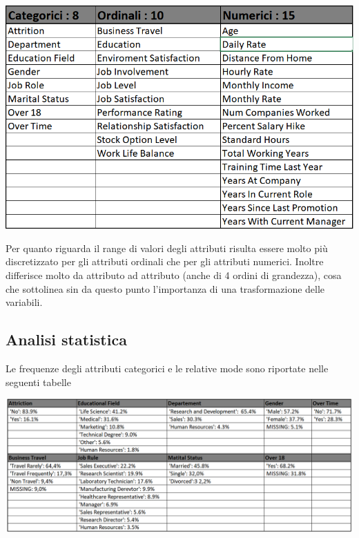 \documentclass[english]{article}
\begin{document}
\begin{center}
\includegraphics[scale=0.50]{semantics.png}
\end{center}
Per quanto riguarda il range di valori degli attributi risulta essere molto più discretizzato per gli attributi ordinali che per gli attributi numerici. Inoltre differisce molto da attributo ad attributo (anche di 4 ordini di grandezza), cosa che sottolinea sin da questo punto l'importanza di una trasformazione delle variabili.

\subsection{Analisi statistica}
Le frequenze degli attributi categorici e le relative mode sono riportate nelle seguenti tabelle

\begin{center}
\includegraphics[scale=1.28]{frequenza attributi nominali.png}
\end{center}
\end{document}
